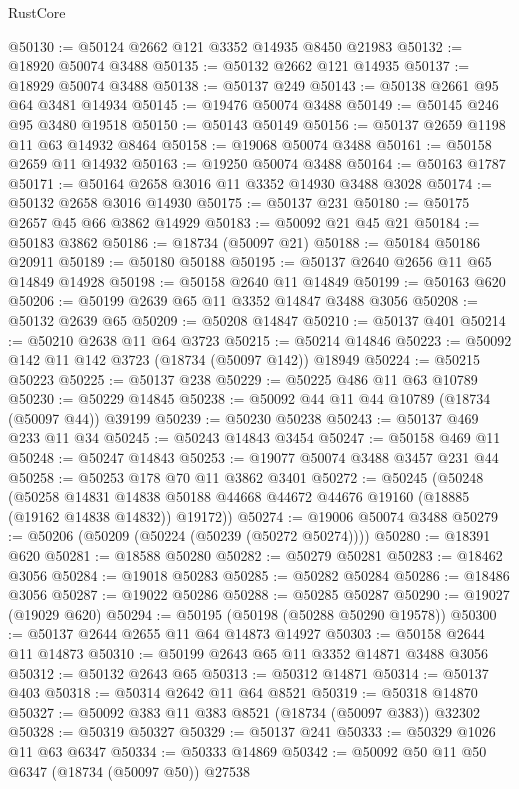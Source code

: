 \begin{lexlean}{RustCore}
\begin{coremodule}
@50130 := @50124 @2662 @121 @3352 @14935 @8450 @21983
@50132 := @18920 @50074 @3488
@50135 := @50132 @2662 @121 @14935
@50137 := @18929 @50074 @3488
@50138 := @50137 @249
@50143 := @50138 @2661 @95 @64 @3481 @14934
@50145 := @19476 @50074 @3488
@50149 := @50145 @246 @95 @3480 @19518
@50150 := @50143 @50149
@50156 := @50137 @2659 @1198 @11 @63 @14932 @8464
@50158 := @19068 @50074 @3488
@50161 := @50158 @2659 @11 @14932
@50163 := @19250 @50074 @3488
@50164 := @50163 @1787
@50171 := @50164 @2658 @3016 @11 @3352 @14930 @3488 @3028
@50174 := @50132 @2658 @3016 @14930
@50175 := @50137 @231
@50180 := @50175 @2657 @45 @66 @3862 @14929
@50183 := @50092 @21 @45 @21
@50184 := @50183 @3862
@50186 := @18734 (@50097 @21)
@50188 := @50184 @50186 @20911
@50189 := @50180 @50188
@50195 := @50137 @2640 @2656 @11 @65 @14849 @14928
@50198 := @50158 @2640 @11 @14849
@50199 := @50163 @620
@50206 := @50199 @2639 @65 @11 @3352 @14847 @3488 @3056
@50208 := @50132 @2639 @65
@50209 := @50208 @14847
@50210 := @50137 @401
@50214 := @50210 @2638 @11 @64 @3723
@50215 := @50214 @14846
@50223 := @50092 @142 @11 @142 @3723 (@18734 (@50097 @142)) @18949
@50224 := @50215 @50223
@50225 := @50137 @238
@50229 := @50225 @486 @11 @63 @10789
@50230 := @50229 @14845
@50238 := @50092 @44 @11 @44 @10789 (@18734 (@50097 @44)) @39199
@50239 := @50230 @50238
@50243 := @50137 @469 @233 @11 @34
@50245 := @50243 @14843 @3454
@50247 := @50158 @469 @11
@50248 := @50247 @14843
@50253 := @19077 @50074 @3488 @3457 @231 @44
@50258 := @50253 @178 @70 @11 @3862 @3401
@50272 := @50245
    (@50248
      (@50258
        @14831
        @14838
        @50188
        @44668
        @44672
        @44676
        @19160
        (@18885 (@19162 @14838 @14832))
        @19172))
@50274 := @19006 @50074 @3488
@50279 := @50206 (@50209 (@50224 (@50239 (@50272 @50274))))
@50280 := @18391 @620
@50281 := @18588 @50280
@50282 := @50279 @50281
@50283 := @18462 @3056
@50284 := @19018 @50283
@50285 := @50282 @50284
@50286 := @18486 @3056
@50287 := @19022 @50286
@50288 := @50285 @50287
@50290 := @19027 (@19029 @620)
@50294 := @50195 (@50198 (@50288 @50290 @19578))
@50300 := @50137 @2644 @2655 @11 @64 @14873 @14927
@50303 := @50158 @2644 @11 @14873
@50310 := @50199 @2643 @65 @11 @3352 @14871 @3488 @3056
@50312 := @50132 @2643 @65
@50313 := @50312 @14871
@50314 := @50137 @403
@50318 := @50314 @2642 @11 @64 @8521
@50319 := @50318 @14870
@50327 := @50092 @383 @11 @383 @8521 (@18734 (@50097 @383)) @32302
@50328 := @50319 @50327
@50329 := @50137 @241
@50333 := @50329 @1026 @11 @63 @6347
@50334 := @50333 @14869
@50342 := @50092 @50 @11 @50 @6347 (@18734 (@50097 @50)) @27538

\end{coremodule}
\end{lexlean}
